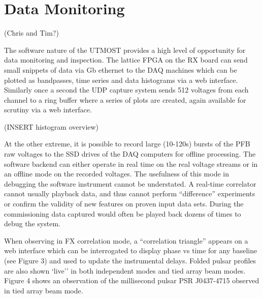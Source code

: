 \section{Data Monitoring }(Chris and Tim?)

The software nature of the UTMOST provides a high level of opportunity for data monitoring and inspection. The lattice FPGA on the RX board can send small snippets of data via Gb ethernet to the DAQ machines which can be plotted as bandpasses, time series and data histograms via a web interface. Similarly once a second the UDP capture system sends 512 voltages from each channel to a ring buffer where a series of plots are created, again available for scrutiny via a web interface.

(INSERT histogram overview)

At the other extreme, it is possible to record large (10-120s) bursts of the PFB raw voltages to the SSD drives of the DAQ computers for offline processing. The software backend can either operate in real time on the real voltage streams or in an offline mode on the recorded voltages. The usefulness of this mode in debugging the software instrument cannot be understated. A real-time correlator cannot usually playback data, and thus cannot perform ``difference'' experiments or confirm the validity of new features on proven input data sets. During the commissioning data captured would often be played back dozens of times to debug the system.

When observing in FX correlation mode, a ``correlation triangle'' appears on a web interface which can be interrogated to display phase vs time for any baseline (see Figure 3) and used to update the instrumental delays.
Folded pulsar profiles are also shown `live'' in both independent modes and tied array beam modes. Figure 4 shows an observation of the millisecond pulsar PSR J0437-4715 observed in tied array beam mode.
